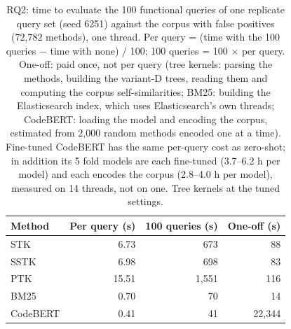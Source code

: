 \begin{table}[!htbp]
\centering
\caption{RQ2: time to evaluate the 100 functional queries of one replicate query set (seed 6251) against the corpus with false positives (72,782 methods), one thread. Per query = (time with the 100 queries $-$ time with none) / 100; 100 queries = 100 $\times$ per query. One-off: paid once, not per query (tree kernels: parsing the methods, building the variant-D trees, reading them and computing the corpus self-similarities; BM25: building the Elasticsearch index, which uses Elasticsearch's own threads; CodeBERT: loading the model and encoding the corpus, estimated from 2,000 random methods encoded one at a time). Fine-tuned CodeBERT has the same per-query cost as zero-shot; in addition its 5 fold models are each fine-tuned (3.7--6.2 h per model) and each encodes the corpus (2.8--4.0 h per model), measured on 14 threads, not on one. Tree kernels at the tuned settings.}
\label{tab:rq2cost}
\footnotesize
\setlength{\tabcolsep}{4pt}
\begin{tabular}{lrrr}
\toprule
Method & Per query (s) & 100 queries (s) & One-off (s) \\
\midrule
STK & 6.73 & 673 & 88 \\
SSTK & 6.98 & 698 & 83 \\
PTK & 15.51 & 1,551 & 116 \\
BM25 & 0.70 & 70 & 14 \\
CodeBERT & 0.41 & 41 & 22,344 \\
\bottomrule
\end{tabular}
\end{table}
